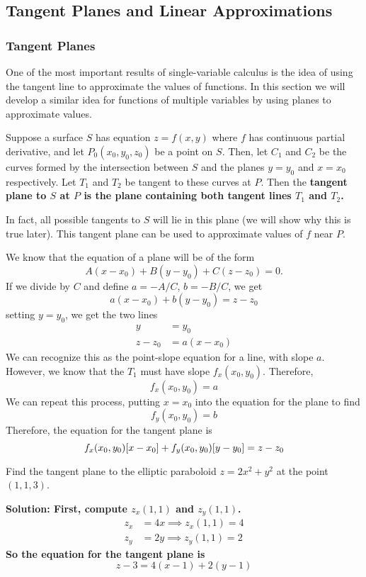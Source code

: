 \subsection{Tangent Planes and Linear Approximations}
\subsubsection{Tangent Planes}
One of the most important results of single-variable calculus is the idea of using the tangent line to approximate the values of functions. In this section we will develop a similar idea for functions of multiple variables by using planes to approximate values.\par
Suppose a surface \(S\) has equation \(z=f(x,y)\) where \(f\) has continuous partial derivative, and let \(P_0(x_0, y_0, z_0)\) be a point on \(S\). Then, let \(C_1\) and \(C_2\) be the curves formed by the intersection between \(S\) and the planes \(y=y_0\) and \(x=x_0\) respectively. Let \(T_1\) and \(T_2\) be tangent to these curves at \(P\). Then the \bf{tangent plane} to \(S\) at \(P\) is the plane containing both tangent lines \(T_1\) and \(T_2\).\par
In fact, all possible tangents to \(S\) will lie in this plane (we will show why this is true later). This tangent plane can be used to approximate values of \(f\) near \(P\).\par
We know that the equation of a plane will be of the form
\[ A(x-x_0) + B(y-y_0) + C(z - z_0)=0.\]
If we divide by \(C\) and define \(a=-A/C\), \(b=-B/C\), we get
\[ a(x-x_0)+b(y-y_0)=z-z_0\]
setting \(y=y_0\), we get the two lines
\begin{align*}
    y &= y_0 \\
    z-z_0 &= a(x-x_0)
\end{align*}
We can recognize this as the point-slope equation for a line, with slope \(a\). However, we know that the \(T_1\) must have slope \(f_x(x_0, y_0)\). Therefore,
\[ f_x(x_0, y_0) = a\]
We can repeat this process, putting \(x=x_0\) into the equation for the plane to find 
\[ f_y(x_0, y_0) = b\]
Therefore, the equation for the tangent plane is
\[ f_x(x_0,y_0)\bqty{x-x_0} + f_y(x_0,y_0)\bqty{y-y_0}=z-z_0\]
\begin{example}
    Find the tangent plane to the elliptic paraboloid \(z=2x^2+y^2\) at the point \((1,1,3)\).\par\bf{Solution: }First, compute \(z_x(1,1)\) and \(z_y(1,1)\).
    \begin{align*}
    z_x &= 4x \implies z_x(1,1) = 4\\
    z_y &= 2y \implies z_y(1,1) = 2
    \end{align*}
    So the equation for the tangent plane is
    \[ z-3 = 4(x - 1) + 2(y - 1)\]
\end{example}
